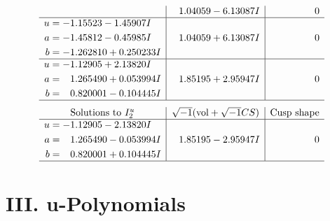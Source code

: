 \documentclass[1p]{elsarticle_modified}
\theoremstyle{definition}
\newcommand{\I}{\sqrt{-1}}
\begin{document}
$$\begin{array}{c|c|c}
 & \phantom{-}1.04059 - 6.13087 I & \phantom{-0.000000 } 0 \\ \hline\begin{aligned}
u &= -1.15523 - 1.45907 I \\
a &= -1.45812 - 0.45985 I \\
b &= -1.262810 + 0.250233 I\end{aligned}
 & \phantom{-}1.04059 + 6.13087 I & \phantom{-0.000000 } 0 \\ \hline\begin{aligned}
u &= -1.12905 + 2.13820 I \\
a &= \phantom{-}1.265490 + 0.053994 I \\
b &= \phantom{-}0.820001 - 0.104445 I\end{aligned}
 & \phantom{-}1.85195 + 2.95947 I & \phantom{-0.000000 } 0\\
 \hline 
 \end{array}$$\newpage$$\begin{array}{c|c|c}  
\text{Solutions to }I^u_{2}& \I (\text{vol} + \sqrt{-1}CS) & \text{Cusp shape}\\
 \hline 
\begin{aligned}
u &= -1.12905 - 2.13820 I \\
a &= \phantom{-}1.265490 - 0.053994 I \\
b &= \phantom{-}0.820001 + 0.104445 I\end{aligned}
 & \phantom{-}1.85195 - 2.95947 I & \phantom{-0.000000 } 0\\
 \hline 
 \end{array}$$\newpage
\newpage\renewcommand{\arraystretch}{1}
\centering \section*{ III. u-Polynomials}
\end{document}
